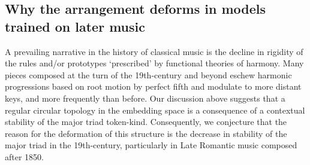 \subsection{Why the arrangement deforms in models trained on later music}
A prevailing narrative in the history of classical music is the decline in rigidity of the rules and/or prototypes `prescribed' by functional theories of harmony. Many pieces composed at the turn of the 19th-century and beyond eschew harmonic progressions based on root motion by perfect fifth and modulate to more distant keys, and more frequently than before. Our discussion above suggests that a regular circular topology in the embedding space is a consequence of a contextual stability of the major triad token-kind. Consequently, we conjecture that the reason for the deformation of this structure is the decrease in stability of the major triad in the 19th-century, particularly in Late Romantic music composed after 1850.